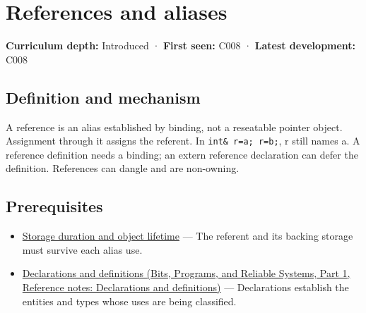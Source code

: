 \hypertarget{appendix-d6d562ca9fbb}{}\label{referencestart:appendix-d6d562ca9fbb}
\section{References and aliases}\label{appendix-d6d562ca9fbb-references-and-aliases}

\hypertarget{appendix-d6d562ca9fbb-references-and-aliases}{}

\textbf{Curriculum depth:} Introduced · \textbf{First seen:} C008 · \textbf{Latest development:} C008

\begin{allmightroledefinition}

\subsection{Definition and mechanism}\label{appendix-d6d562ca9fbb-definition-and-mechanism}

\hypertarget{appendix-d6d562ca9fbb-definition-and-mechanism}{}

A reference is an alias established by binding, not a reseatable pointer object. Assignment through it assigns the referent. In \texttt{int\&\ r=a;\ r=b;}, r still names a. A reference definition needs a binding; an extern reference declaration can defer the definition. References can dangle and are non-owning.

\end{allmightroledefinition}

\subsection{Prerequisites}\label{appendix-d6d562ca9fbb-prerequisites}

\hypertarget{appendix-d6d562ca9fbb-prerequisites}{}

\begin{itemize}
\tightlist
\item
  \hyperref[appendix-0b104bcba06b]{Storage duration and object lifetime} --- The referent and its backing storage must survive each alias use.
\item
  \href{../01-Bits-Programs-and-Reliable-Systems-P01/main.pdf\#nameddest=appendix-2e4d494c2d94}{Declarations and definitions (Bits, Programs, and Reliable Systems, Part 1, Reference notes: Declarations and definitions)} --- Declarations establish the entities and types whose uses are being classified.
\end{itemize}

